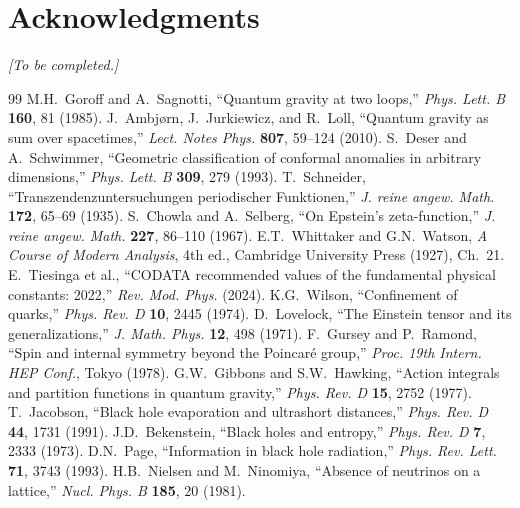 \documentclass[12pt,a4paper]{article}
\begin{document}
\section*{Acknowledgments}

\emph{[To be completed.]}

\begin{thebibliography}{99}
 M.H.~Goroff and A.~Sagnotti, ``Quantum gravity at two loops,'' \emph{Phys. Lett. B} \textbf{160}, 81 (1985).
 J.~Ambj\o rn, J.~Jurkiewicz, and R.~Loll, ``Quantum gravity as sum over spacetimes,'' \emph{Lect. Notes Phys.} \textbf{807}, 59--124 (2010).
 S.~Deser and A.~Schwimmer, ``Geometric classification of conformal anomalies in arbitrary dimensions,'' \emph{Phys. Lett. B} \textbf{309}, 279 (1993).
 T.~Schneider, ``Transzendenzuntersuchungen periodischer Funktionen,'' \emph{J. reine angew. Math.} \textbf{172}, 65--69 (1935).
 S.~Chowla and A.~Selberg, ``On Epstein's zeta-function,'' \emph{J. reine angew. Math.} \textbf{227}, 86--110 (1967).
 E.T.~Whittaker and G.N.~Watson, \emph{A Course of Modern Analysis}, 4th ed., Cambridge University Press (1927), Ch.~21.
 E.~Tiesinga et al., ``CODATA recommended values of the fundamental physical constants: 2022,'' \emph{Rev. Mod. Phys.} (2024).
 K.G.~Wilson, ``Confinement of quarks,'' \emph{Phys. Rev. D} \textbf{10}, 2445 (1974).
 D.~Lovelock, ``The Einstein tensor and its generalizations,'' \emph{J. Math. Phys.} \textbf{12}, 498 (1971).
 F.~Gursey and P.~Ramond, ``Spin and internal symmetry beyond the Poincar\'e group,'' \emph{Proc. 19th Intern. HEP Conf.}, Tokyo (1978).
 G.W.~Gibbons and S.W.~Hawking, ``Action integrals and partition functions in quantum gravity,'' \emph{Phys. Rev. D} \textbf{15}, 2752 (1977).
 T.~Jacobson, ``Black hole evaporation and ultrashort distances,'' \emph{Phys. Rev. D} \textbf{44}, 1731 (1991).
 J.D.~Bekenstein, ``Black holes and entropy,'' \emph{Phys. Rev. D} \textbf{7}, 2333 (1973).
 D.N.~Page, ``Information in black hole radiation,'' \emph{Phys. Rev. Lett.} \textbf{71}, 3743 (1993).
 H.B.~Nielsen and M.~Ninomiya, ``Absence of neutrinos on a lattice,'' \emph{Nucl. Phys. B} \textbf{185}, 20 (1981).
\end{thebibliography}

\appendix
\end{document}
